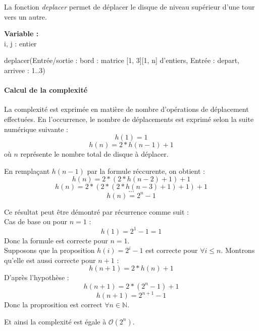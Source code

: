 La fonction \emph{deplacer} permet de déplacer le disque de niveau supérieur d'une tour vers un autre.

\begin{function}[H]
    \textbf{Variable :}\\
    i, j : entier\;
    \caption{deplacer(Entrée/sortie : bord : matrice {[1, 3]}{[1, n]} d'entiers, Entrée : depart, arrivee : 1..3)}
\end{function}

\paragraph{Calcul de la complexité}
La complexité est exprimée en matière de nombre d'opérations de déplacement effectuées. En l'occurrence, le nombre de déplacements est exprimé selon la suite numérique suivante :
$$ h(1) = 1 $$
$$ h(n) = 2 * h(n - 1) + 1 $$
où $n$ représente le nombre total de disque à déplacer.

En remplaçant $h(n - 1)$ par la formule réccurente, on obtient :
$$ h(n) = 2 * (2 * h(n - 2) + 1) + 1 $$
$$ h(n) = 2 * (2 * (2 * h(n - 3) + 1) + 1) + 1 $$
$$ ... $$
$$ h(n) = 2^{n} - 1 $$

Ce résultat peut être démontré par récurrence comme suit :\\
Cas de base ou pour $n = 1$ :
$$ h(1) = 2^{1} - 1 = 1$$
Donc la formule est correcte pour $n = 1$.\\
Supposons que la proposition $h(i) = 2^{i} - 1$ est correcte pour $\forall i \leq n$. Montrons qu'elle est aussi correcte pour $n + 1$ :
$$ h(n + 1) = 2 * h(n) + 1$$
D'après l'hypothèse :
$$ h(n + 1) = 2 * (2^{n} - 1) + 1 $$
$$ h(n + 1) = 2^{n + 1} - 1$$
Donc la proprosition est correct $\forall n \in \mathbb{N}$.\par
Et ainsi la complexité est égale à $\mathcal{O}(2^{n})$.

